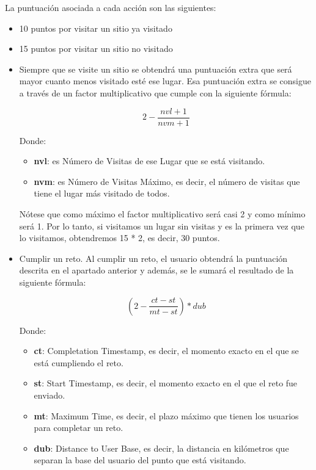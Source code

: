 La puntuación asociada a cada acción son las siguientes:
\begin{itemize}
\item 10 puntos por visitar un sitio ya visitado
\item 15 puntos por visitar un sitio no visitado
\item Siempre que se visite un sitio se obtendrá una puntuación extra que será mayor cuanto menos visitado esté ese lugar. Esa puntuación extra se consigue a través de un factor multiplicativo que cumple con la siguiente fórmula:

\begin{displaymath}
2 - \frac{nvl + 1}{nvm + 1}
\end{displaymath}

Donde:
\begin{itemize}
    \item \textbf{nvl}: es Número de Visitas de ese Lugar que se está visitando.
    \item \textbf{nvm}: es Número de Visitas Máximo, es decir, el número de visitas que tiene el lugar más visitado de todos.
\end{itemize}

Nótese que como máximo el factor multiplicativo será casi 2 y como mínimo será 1. Por lo tanto, si visitamos un lugar sin visitas y es la primera vez que lo visitamos, obtendremos 15 * 2, es decir, 30 puntos.

\item Cumplir un reto. Al cumplir un reto, el usuario obtendrá la puntuación descrita en el apartado anterior y además, se le sumará el resultado de la siguiente fórmula:

\begin{displaymath}
(2 - \frac{ct-st}{mt-st})*dub
\end{displaymath}

Donde:
\begin{itemize}
    \item \textbf{ct}: Completation Timestamp, es decir, el momento exacto en el que se está cumpliendo el reto.
    \item \textbf{st}: Start Timestamp, es decir, el momento exacto en el que el reto fue enviado.
    \item \textbf{mt}: Maximum Time, es decir, el plazo máximo que tienen los usuarios para completar un reto.
    \item \textbf{dub}: Distance to User Base, es decir, la distancia en kilómetros que separan la base del usuario del punto que está visitando.


\end{itemize}
\end{itemize}

